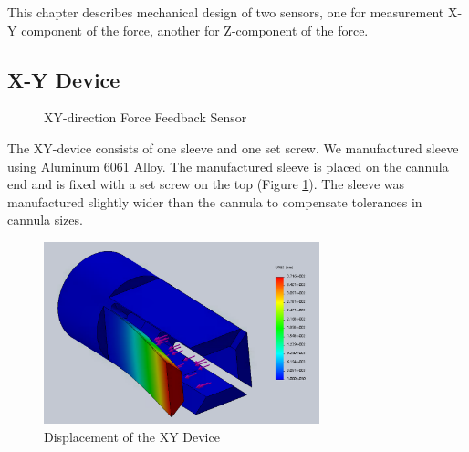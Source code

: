 This chapter describes mechanical design of two sensors, one for measurement X-Y component of the force, another for Z-component of the force. 

\subsection{X-Y Device}
\label{sec:xyDir}

\begin{figure}[h]%
\centering
{}%
\qquad
{}%
\caption{XY-direction Force Feedback Sensor}
\label{fig:XY_device_design}%
\end{figure}

The XY-device consists of one sleeve and one set screw. We manufactured sleeve using Aluminum 6061 Alloy. %
The manufactured sleeve is placed on the cannula end and is fixed with a set screw on the top (Figure \ref{fig:XY_device_design}). The sleeve was manufactured slightly wider than the cannula to compensate tolerances in cannula sizes.

\begin{figure}[h]
	\begin{center}
		\includegraphics[width=80mm]{fig/methods/old_sleeve_displ.png}
	\end{center}
	\vspace{-4mm}
	\caption[Displacement of the XY Device]
	{Displacement of the XY Device}
	\label{fig:xy-displ}
	\vspace{-2mm}
\end{figure}

